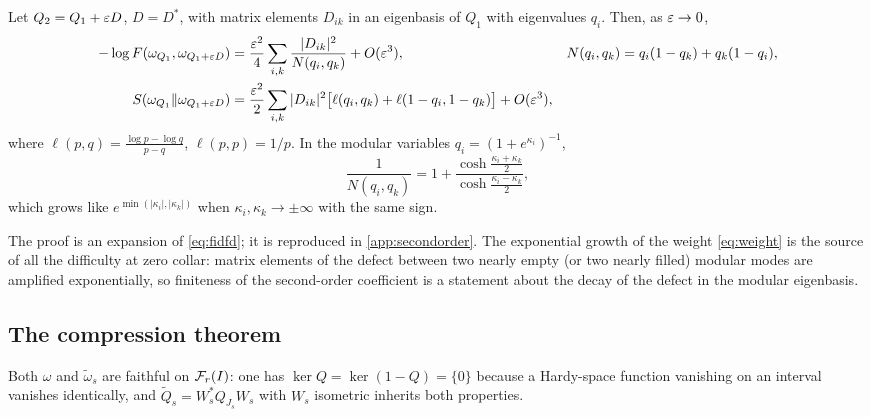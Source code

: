 \begin{proposition}\label{prop:secondorder}
Let $Q_2=Q_1+\varepsilon D$, $D=D^*$, with matrix elements $D_{ik}$ in an eigenbasis of
$Q_1$ with eigenvalues $q_i$.  Then, as $\varepsilon\to0$,
\begin{align}
 -\log F(\omega_{Q_1},\omega_{Q_1+\varepsilon D})
 &=\frac{\varepsilon^2}4\sum_{i,k}\frac{|D_{ik}|^2}{N(q_i,q_k)}+O(\varepsilon^3),
 && N(q_i,q_k)=q_i(1-q_k)+q_k(1-q_i),\label{eq:qfi}\\
 S(\omega_{Q_1}\Vert\omega_{Q_1+\varepsilon D})
 &=\frac{\varepsilon^2}2\sum_{i,k}|D_{ik}|^2
 \bigl[\ell(q_i,q_k)+\ell(1-q_i,1-q_k)\bigr]+O(\varepsilon^3),\label{eq:km}
\end{align}
where $\ell(p,q)=\frac{\log p-\log q}{p-q}$, $\ell(p,p)=1/p$.  In the modular
variables $q_i=(1+e^{\kappa_i})^{-1}$,
\begin{equation}\label{eq:weight}
 \frac1{N(q_i,q_k)}=1+\frac{\cosh\frac{\kappa_i+\kappa_k}2}
 {\cosh\frac{\kappa_i-\kappa_k}2},
\end{equation}
which grows like $e^{\min(|\kappa_i|,|\kappa_k|)}$ when
$\kappa_i,\kappa_k\to\pm\infty$ with the same sign.
\end{proposition}

The proof is an expansion of \eqref{eq:fidfd}; it is reproduced in
\cref{app:secondorder}.  The exponential growth of the weight \eqref{eq:weight} is
the source of all the difficulty at zero collar: matrix elements of the defect
between two nearly empty (or two nearly filled) modular modes are amplified
exponentially, so finiteness of the second-order coefficient is a statement about
the decay of the defect in the modular eigenbasis.

\subsection{The compression theorem}
Both $\omega$ and $\widetilde\omega_s$ are faithful on $\mathcal F_r(I)$: one has
$\ker Q=\ker(1-Q)=\{0\}$ because a Hardy-space function vanishing on an interval
vanishes identically, and $\widetilde Q_s=W_s^*Q_{J_s}W_s$ with $W_s$ isometric
inherits both properties.

